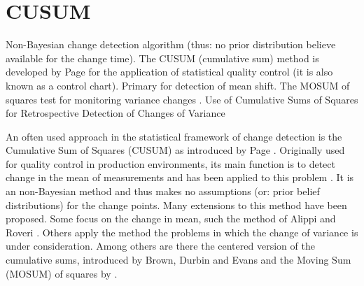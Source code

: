 \section{CUSUM}\label{cusum}




Non-Bayesian change detection algorithm (thus: no prior distribution believe available for the change time).
The CUSUM (cumulative sum) method is developed by Page \cite{page1954continuous} for the application of statistical quality control (it is also known as a control chart).
Primary for detection of mean shift.
The MOSUM of squares test for monitoring variance changes \cite{hsu2007mosum}.
Use of Cumulative Sums of Squares for Retrospective Detection of Changes of Variance \cite{inclan1994use}

An often used approach in the statistical framework of change detection is the Cumulative Sum of Squares (CUSUM) as introduced by Page \cite{page1954continuous}.
Originally used for quality control in production environments, its main function is to detect change in the mean of measurements and has been applied to this problem \cite{basseville1993detection}.
It is an non-Bayesian method and thus makes no assumptions (or: prior belief distributions) for the change points.
Many extensions to this method have been proposed.
Some focus on the change in mean, such the method of Alippi and Roveri \cite{alippi2006adaptive}.
Others apply the method the problems in which the change of variance is under consideration.
Among others are there the centered version of the cumulative sums, introduced by Brown, Durbin and Evans \cite{brown1975techniques} and the Moving Sum (MOSUM) of squares by \cite{hsu2007mosum}.

